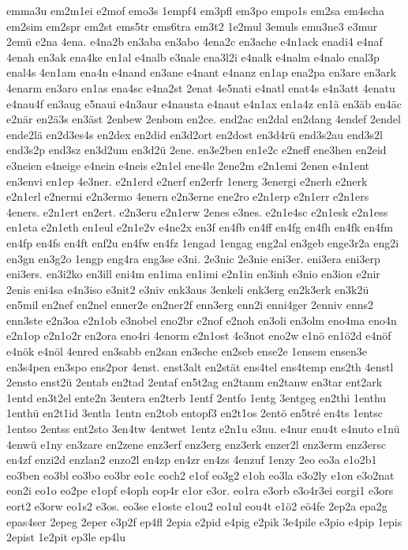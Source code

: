 {emma3u
em2m1ei
e2mof
emo3s
1empf4
em3pfl
em3po
empo1s
em2sa
em4scha
em2sim
em2spr
em2st
ems5tr
ems6tra
em3t2
1e2mul
3emuls
emu3ne3
e3mur
2emü
e2na
4ena.
e4na2b
en3aba
en3abo
4ena2c
en3ache
e4n1ack
enadi4
e4naf
4enah
en3ak
ena4ke
en1al
e4nalb
e3nale
ena3l2i
e4nalk
e4nalm
e4nalo
enal3p
enal4s
4en1am
ena4n
e4nand
en3ane
e4nant
e4nanz
en1ap
ena2pa
en3are
en3ark
4enarm
en3aro
en1as
ena4sc
e4na2st
2enat
4e5nati
e4natl
enat4s
e4n3att
4enatu
e4nau4f
en3aug
e5naui
e4n3aur
e4nausta
e4naut
e4n1ax
en1a4z
en1ä
en3äb
en4äc
e2när
en2ä3s
en3äst
2enbew
2enbom
en2ce.
end2ac
en2dal
en2dang
4endef
2endel
ende2lä
en2d3es4s
en2dex
en2did
en3d2ort
en2dost
en3d4rü
end3s2au
end3s2l
end3s2p
end3sz
en3d2um
en3d2ü
2ene.
en3e2ben
en1e2c
e2neff
ene3hen
en2eid
e3neien
e4neige
e4nein
e4neis
e2n1el
ene4le
2ene2m
e2n1emi
2enen
e4n1ent
en3envi
en1ep
4e3ner.
e2n1erd
e2nerf
en2erfr
1energ
3energi
e2nerh
e2nerk
e2n1erl
e2nermi
e2n3ermo
4enern
e2n3erne
ene2ro
e2n1erp
e2n1err
e2n1ers
4eners.
e2n1ert
en2ert.
e2n3eru
e2n1erw
2enes
e3nes.
e2n1e4sc
e2n1esk
e2n1ess
en1eta
e2n1eth
en1eul
e2n1e2v
e4ne2x
en3f
en4fb
en4ff
en4fg
en4fh
en4fk
en4fm
en4fp
en4fs
en4ft
enf2u
en4fw
en4fz
1engad
1engag
eng2al
en3geb
enge3r2a
eng2i
en3gn
en3g2o
1engp
eng4ra
eng3se
e3ni.
2e3nic
2e3nie
eni3er.
eni3era
eni3erp
eni3ers.
en3i2ko
en3ill
eni4m
en1ima
en1imi
e2n1in
en3inh
e3nio
en3ion
e2nir
2enis
eni4sa
e4n3iso
e3nit2
e3niv
enk3aus
3enkeli
enk3erg
en2k3erk
en3k2ü
en5mil
en2nef
en2nel
enner2e
en2ner2f
enn3erg
enn2i
enni4ger
2enniv
enns2
enn3ste
e2n3oa
e2n1ob
e3nobel
eno2br
e2nof
e2noh
en3oli
en3olm
eno4ma
eno4n
e2n1op
e2n1o2r
en2ora
eno4ri
4enorm
e2n1ost
4e3not
eno2w
e1nö
en1ö2d
e4nöf
e4nök
e4nöl
4enred
en3sabb
en2san
en3sche
en2seb
ense2e
1ensem
ensen3e
en3s4pen
en3spo
ens2por
4enst.
enst3alt
en2stät
ens4tel
ens4temp
ens2th
4enstl
2ensto
enst2ü
2entab
en2tad
2entaf
en5t2ag
en2tanm
en2tanw
en3tar
ent2ark
1entd
en3t2el
ente2n
3entera
en2terb
1entf
2entfo
1entg
3entgeg
en2thi
1enthu
1enthü
en2t1id
3entla
1entn
en2tob
entopf3
en2t1os
2entö
en5tré
en4ts
1entsc
1entso
2entss
ent2sto
3en4tw
4entwet
1entz
e2n1u
e3nu.
e4nur
enu4t
e4nuto
e1nü
4enwü
e1ny
en3zare
en2zene
enz3erf
enz3erg
enz3erk
enzer2l
enz3erm
enz3ersc
en4zf
enzi2d
enzlan2
enzo2l
en4zp
en4zr
en4zs
4enzuf
1enzy
2eo
eo3a
e1o2b1
eo3ben
eo3bl
eo3bo
eo3br
eo1c
eoch2
e1of
eo3g2
e1oh
eo3la
e3o2ly
e1on
e3o2nat
eon2i
eo1o
eo2pe
e1opf
e4oph
eop4r
e1or
e3or.
eo1ra
e3orb
e3o4r3ei
eorgi1
e3ors
eort2
e3orw
eo1s2
e3os.
eo3se
e1oste
e1ou2
eo1ul
eou4t
e1ö2
eö4fe
2ep2a
epa2g
epas4ser
2epeg
2eper
e3p2f
ep4fl
2epia
e2pid
e4pig
e2pik
3e4pile
e3pio
e4pip
1epis
2epist
1e2pit
ep3le
ep4lu
}
